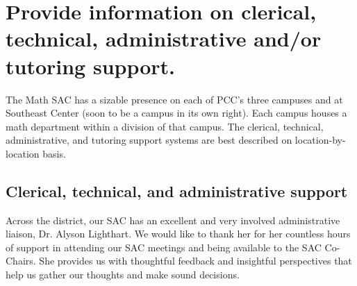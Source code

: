 


\section[Clerical, technical, administrative and/or tutoring support]{Provide
  information on clerical, technical, administrative and/or tutoring support.}

The Math SAC has a sizable presence on each of PCC's three campuses and at Southeast Center (soon to be a campus in its own right).
Each campus houses a math department within a division of that campus.
The clerical, technical, administrative, and tutoring support systems are best described on location-by-location basis.

\subsection{Clerical, technical, and administrative support}

Across the district, our SAC has an excellent and very involved administrative liaison, Dr.
Alyson Lighthart.
We would like to thank her for her countless hours of support in attending our SAC meetings and being available to the SAC Co-Chairs.
She provides us with thoughtful feedback and insightful perspectives that help us gather our thoughts and make sound decisions.

